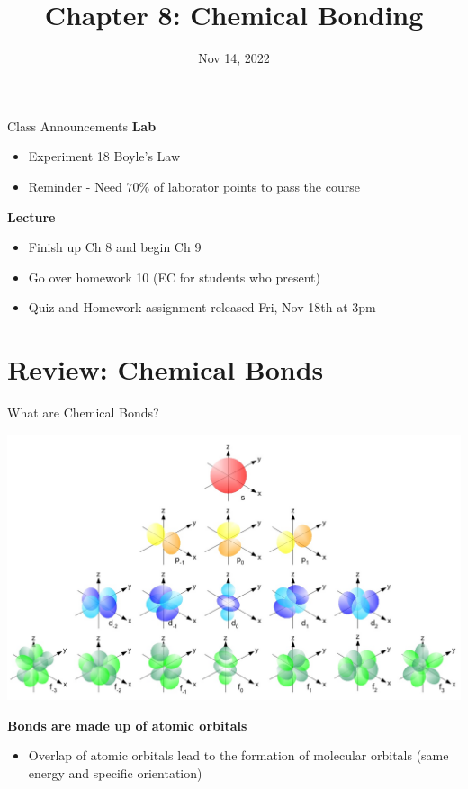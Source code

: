 \documentclass[11pt]{beamer}
\title{Chapter 8: Chemical Bonding}
\institute{Chemistry Department, Cypress College}
\date{Nov 14, 2022}
\begin{document}
\begin{frame}
  \titlepage
\end{frame}

\begin{frame}{Class Announcements}
  \textbf{Lab}
  \begin{itemize}
  \item Experiment 18 Boyle's Law
  \item Reminder - Need $70\%$ of laborator points to pass
    the course
  \end{itemize}

  \textbf{Lecture}
  \begin{itemize}
  \item Finish up Ch 8 and begin Ch 9
  \item Go over homework 10 (EC for students who present)
  \item Quiz and Homework assignment released Fri, Nov 18th at 3pm
  \end{itemize}
\end{frame}

\section{Review: Chemical Bonds}

\begin{frame}{What are Chemical Bonds?}
  \begin{center}
    \includegraphics[width=0.8\linewidth]{single_elect_orb}
  \end{center}
  \textbf{Bonds are made up of atomic orbitals}
  \begin{itemize}
  \item Overlap of atomic orbitals lead to the formation of molecular
    orbitals (same energy and specific orientation)
  \end{itemize}
\end{frame}
\end{document}
